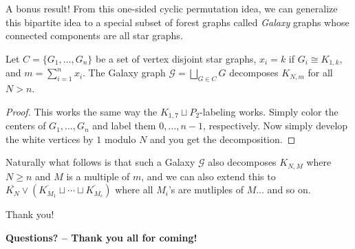 \documentclass[xcolor=x11names,compress,8pt]{beamer}
\theoremstyle{plain}
\newcommand{\GG}{\ensuremath{\mathcal{G}}}
\begin{document}
\begin{frame}{A bonus result!}
From this one-sided cyclic permutation idea, we can generalize this bipartite idea to a special subset of forest graphs called \textit{Galaxy} graphs whose connected components are all star graphs.

\begin{theorem}
Let $C=\{G_{1},\hdots, G_{n}\}$ be a set of vertex disjoint star graphs, $x_{i}=k$ if $G_{i}\cong K_{1,k}$, and $m=\sum_{i=1}^{n} x_{i}$. The Galaxy graph $\GG=\bigsqcup_{G\in C} G$ decomposes $K_{N,m}$ for all $N>n$. 
\end{theorem}
\begin{proof}
This works the same way the $K_{1,7}\sqcup P_{2}$-labeling works. Simply color the centers of $G_{1},\hdots,G_{n}$ and label them $0,\hdots,n-1$, respectively. Now simply develop the white vertices by $1$ modulo $N$ and you get the decomposition.
\end{proof}
Naturally what follows is that such a Galaxy $\GG$ also decomposes $K_{N,M}$ where $N\geq n$ and $M$ is a multiple of $m$, and we can also extend this to $\overline{K_{N}}\lor (\overline{K_{M_{1}}}\sqcup \cdots \sqcup \overline{K_{M_{c}}})$ where all $M_{i}$'s are mutliples of $M$... and so on.
\end{frame}

\begin{frame}{Thank you!}

\begin{center}
    \textbf{Questions? -- Thank you all for coming!}
\end{center}

    \end{frame}
\end{document}
